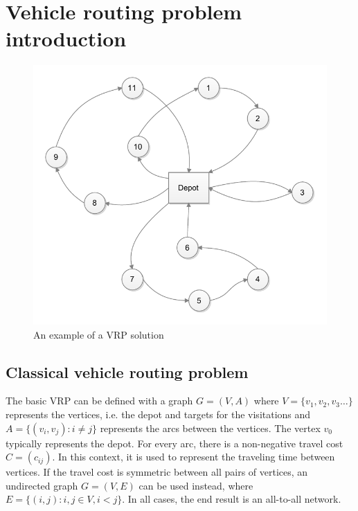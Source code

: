 \chapter{Vehicle routing problem introduction}
\label{chapter:background} 

\begin{figure}[h]
  \begin{center}
    \includegraphics{images/vrpbasic.pdf}
    \caption{An example of a VRP solution}
    \label{fig:simplenetwork}
  \end{center}
\end{figure}

\section{Classical vehicle routing problem}



The basic VRP can be defined with a graph $G = (V, A)$ where $V = \{v_1, v_2, v_3\dots\}$ represents the vertices, i.e. the depot and targets for the visitations and $A = \{(v_i, v_j): i \neq j \}$ represents the arcs between the vertices. The vertex $v_0$ typically represents the depot. For every arc, there is a non-negative travel cost $C=(c_{ij})$. In this context, it is used to represent the traveling time between vertices. If the travel cost is symmetric between all pairs of vertices, an undirected graph $G = (V, E)$ can be used instead, where $E=\{(i, j) : i, j \in V, i < j\}$. In all cases, the end result is an all-to-all network. \cite{laporte2007you} 

